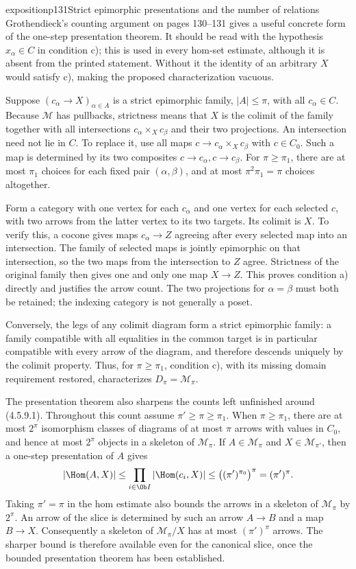 \begin{dcomment}{exposition}{p131}{Strict epimorphic presentations and the number of relations}
Grothendieck's counting argument on pages 130--131 gives a useful concrete form of the one-step presentation theorem. It should be read with the hypothesis $x_\alpha\in C$ in condition c); this is used in every hom-set estimate, although it is absent from the printed statement. Without it the identity of an arbitrary $X$ would satisfy c), making the proposed characterization vacuous.

Suppose $(c_\alpha\to X)_{\alpha\in A}$ is a strict epimorphic family, $|A|\leq\pi$, with all $c_\alpha\in C$. Because $\mathcal M$ has pullbacks, strictness means that $X$ is the colimit of the family together with all intersections $c_\alpha\times_Xc_\beta$ and their two projections. An intersection need not lie in $C$. To replace it, use all maps $c\to c_\alpha\times_Xc_\beta$ with $c\in C_0$. Such a map is determined by its two composites $c\to c_\alpha,c\to c_\beta$. For $\pi\geq\pi_1$, there are at most $\pi_1$ choices for each fixed pair $(\alpha,\beta)$, and at most $\pi^2\pi_1=\pi$ choices altogether.

Form a category with one vertex for each $c_\alpha$ and one vertex for each selected $c$, with two arrows from the latter vertex to its two targets. Its colimit is $X$. To verify this, a cocone gives maps $c_\alpha\to Z$ agreeing after every selected map into an intersection. The family of selected maps is jointly epimorphic on that intersection, so the two maps from the intersection to $Z$ agree. Strictness of the original family then gives one and only one map $X\to Z$. This proves condition a) directly and justifies the arrow count. The two projections for $\alpha=\beta$ must both be retained; the indexing category is not generally a poset.

Conversely, the legs of any colimit diagram form a strict epimorphic family: a family compatible with all equalities in the common target is in particular compatible with every arrow of the diagram, and therefore descends uniquely by the colimit property. Thus, for $\pi\geq\pi_1$, condition c), with its missing domain requirement restored, characterizes $D_\pi=\mathcal M_\pi$.

The presentation theorem also sharpens the counts left unfinished around (4.5.9.1). Throughout this count assume $\pi'\geq\pi\geq\pi_1$. When $\pi\geq\pi_1$, there are at most $2^\pi$ isomorphism classes of diagrams of at most $\pi$ arrows with values in $C_0$, and hence at most $2^\pi$ objects in a skeleton of $\mathcal M_\pi$. If $A\in\mathcal M_\pi$ and $X\in\mathcal M_{\pi'}$, then a one-step presentation of $A$ gives
\[
 |\Hom(A,X)|\leq
 \prod_{i\in\Ob I}|\Hom(c_i,X)|
 \leq\bigl((\pi')^{\pi_0}\bigr)^\pi
 =(\pi')^\pi.
\]
Taking $\pi'=\pi$ in the hom estimate also bounds the arrows in a skeleton of $\mathcal M_\pi$ by $2^\pi$. An arrow of the slice is determined by such an arrow $A\to B$ and a map $B\to X$. Consequently a skeleton of $\mathcal M_\pi/X$ has at most $(\pi')^\pi$ arrows. The sharper bound is therefore available even for the canonical slice, once the bounded presentation theorem has been established.
\end{dcomment}

